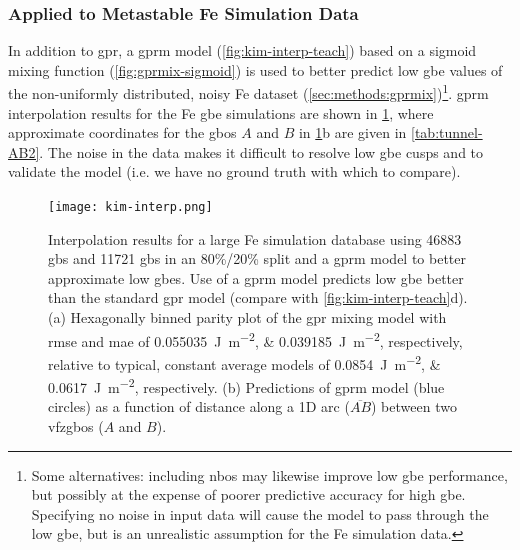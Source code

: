 \documentclass[final,twocolumn,12pt]{elsarticle}
\begin{document}
\subsubsection{ Applied to Metastable Fe Simulation Data}
\label{sec:results:simulation:gprm}
In addition to \gls{gpr}, a \gls{gprm} model (\cref{fig:kim-interp-teach}) based on a sigmoid mixing function (\cref{fig:gprmix-sigmoid}) is used to better predict low \gls{gbe} values of the non-uniformly distributed, noisy Fe dataset (\cref{sec:methods:gprmix})\footnote{Some alternatives: including \glspl{nbo} may likewise improve low \gls{gbe} performance, but possibly at the expense of poorer predictive accuracy for high \gls{gbe}. Specifying no noise in input data will cause the model to pass through the low \gls{gbe}, but is an unrealistic assumption for the Fe simulation data.}. \Gls{gprm} interpolation results for the Fe \gls{gbe} simulations \cite{kimPhasefieldModeling3D2014} are shown in \cref{fig:kim-interp}, where approximate coordinates for the \glspl{gbo} $A$ and $B$ in \cref{fig:kim-interp}b are given in \cref{tab:tunnel-AB2}. The noise in the data makes it difficult to resolve low \gls{gbe} cusps and to validate the model (i.e. we have no ground truth with which to compare).
%
%
\begin{figure}
    \centering
    \texttt{[image: kim-interp.png]}
    \caption{Interpolation results for a large Fe simulation database \cite{kimPhasefieldModeling3D2014} using \num{46883} \inpt{} \glspl{gb} and \num{11721} \outpt{} \glspl{gb} in an 80\%/20\% split and a \gls{gprm} model to better approximate low \glspl{gbe}. Use of a \gls{gprm} model predicts low \gls{gbe} better than the standard \gls{gpr} model (compare with \cref{fig:kim-interp-teach}d). (a) Hexagonally binned parity plot of the \gls{gpr} mixing model with \gls{rmse} and \gls{mae} of \SIlist{0.055035;0.039185}{\J\per\square\meter}, respectively, relative to typical, constant average models of \SIlist{0.0854;0.0617}{\joule\per\square\meter}, respectively. (b) Predictions of \gls{gprm} model (blue circles) as a function of distance along a 1D arc ($\overline{AB}$) between two \glspl{vfzgbo} ($A$ and $B$). }
    \label{fig:kim-interp}
\end{figure}
\end{document}
